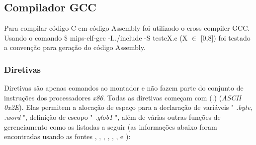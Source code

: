 \documentclass[12pt]{article}
\begin{document}
\subsection{Compilador GCC}
\label{subsec:comp}

Para compilar código C em código Assembly foi utilizado o cross compiler \cite{MIPS} GCC. Usando o comando \$ mips-elf-gcc -I../include -S testeX.c (X $\in$ [0,8]) foi testado a convenção para geração do código Assembly.

\subsubsection{Diretivas}
\label{subsubsec:diretivas}

Diretivas são apenas comandos ao montador e não fazem parte do conjunto de instruções dos processadores \textit{x86}. Todas as diretivas começam com (.) (\textit{ASCII 0x2E}). Elas permitem a alocação de espaço para a declaração de variáveis " \textit{.byte}, \textit{.word} ", definição de escopo " \textit{.glob1} ", além de várias outras funções de gerenciamento como as listadas a seguir (as informações abaixo foram encontradas usando as fontes \cite{mips1}, \cite{mips2-1}, \cite{mips2-2}, \cite{mips2-3}, \cite{mips3},
\cite{mips4}, \cite{mips5} e \cite{mips6} ):
\end{document}
